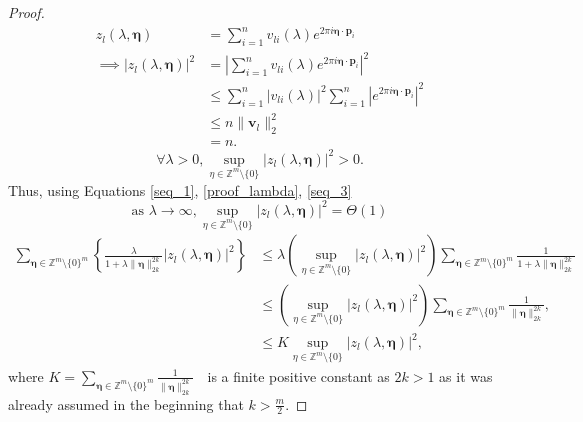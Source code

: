 \documentclass[10pt,a4paper]{amsart}
\begin{document}
\begin{proof}
\begin{equation}
\begin{aligned}
    z_l(\lambda,\boldsymbol{\eta}) &= \sum\limits_{i=1}^n v_{li}(\lambda) e^{2\pi i \boldsymbol{\eta}\cdot\boldsymbol{p}_i }\\
    \implies \left|z_l(\lambda,\boldsymbol{\eta})\right|^2 &=  \left|\sum\limits_{i=1}^n v_{li}(\lambda) e^{2\pi i \boldsymbol{\eta}\cdot\boldsymbol{p}_i } \right|^2\\
    &\le\sum\limits_{i=1}^n \left| v_{li}(\lambda)\right|^2            \sum\limits_{i=1}^n \left|e^{2\pi i \boldsymbol{\eta}\cdot\boldsymbol{p}_i }  \right|^2\\ 
    &\le n\|\boldsymbol{v}_l\|_2^2\\
    &=n.
\end{aligned}
\end{equation}
\begin{equation}\label{seq_3}
\forall \lambda>0, \sup\limits_{\eta\in\mathbb{Z}^m\setminus\{0\}} \left| z_l(\lambda,\boldsymbol{\eta})  \right|^2 > 0.
\end{equation}
Thus, using Equations \ref{seq_1}, \ref{proof_lambda}, \ref{seq_3} \begin{equation}\label{eq_label}
\mbox{as   } \lambda\to\infty, \sup\limits_{\eta\in\mathbb{Z}^m\setminus\{0\}} \left| z_l(\lambda,\boldsymbol{\eta})  \right|^2 = \Theta(1)
\end{equation}
\begin{equation}\label{eq_proof_eig}
\begin{aligned}
\sum_{\boldsymbol{\eta}\in\mathbb{Z}^m\setminus\{0\}^m}\left\{ \frac{\lambda}{1+\lambda\|\boldsymbol{\eta}\|_{2k}^{2k}}\left|z_l(\lambda,\boldsymbol{\eta})\right|^2 \right\} &\le \lambda \left(\sup\limits_{\eta\in\mathbb{Z}^m\setminus\{0\}} \left| z_l(\lambda,\boldsymbol{\eta})  \right|^2\right) \sum_{\boldsymbol{\eta}\in\mathbb{Z}^m\setminus\{0\}^m}\frac{1}{1+\lambda\|\boldsymbol{\eta}\|_{2k}^{2k}} \\
&\le \left(\sup\limits_{\eta\in\mathbb{Z}^m\setminus\{0\}} \left| z_l(\lambda,\boldsymbol{\eta})  \right|^2\right) \sum_{\boldsymbol{\eta}\in\mathbb{Z}^m\setminus\{0\}^m}\frac{1}{\|\boldsymbol{\eta}\|_{2k}^{2k}}, \\
&\le K \sup\limits_{\eta\in\mathbb{Z}^m\setminus\{0\}} \left| z_l(\lambda,\boldsymbol{\eta})  \right|^2,
\end{aligned}
\end{equation} where $K = \sum\limits_{\boldsymbol{\eta}\in\mathbb{Z}^m\setminus\{0\}^m}\frac{1}{\|\boldsymbol{\eta}\|_{2k}^{2k}} \mbox{            }$ is a finite positive constant as $2k>1$ as it was already assumed in the beginning that $k>\frac{m}{2}$.


\end{proof}
\end{document}
